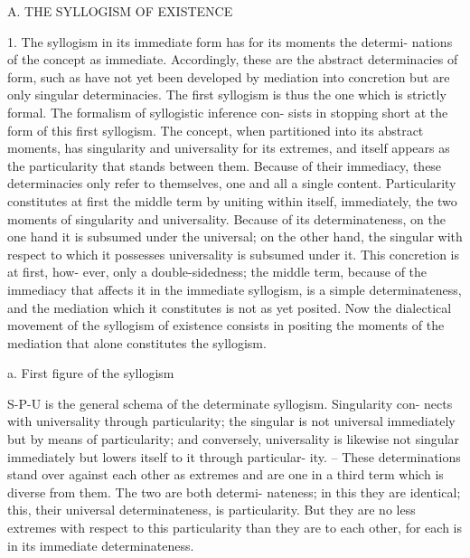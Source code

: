 
A. THE SYLLOGISM OF EXISTENCE

1. The syllogism in its immediate form has for its moments the determi-
nations of the concept as immediate. Accordingly, these are the abstract
determinacies of form, such as have not yet been developed by mediation
into concretion but are only singular determinacies. The first syllogism is thus
the one which is strictly formal. The formalism of syllogistic inference con-
sists in stopping short at the form of this first syllogism. The concept, when
partitioned into its abstract moments, has singularity and universality for its
extremes, and itself appears as the particularity that stands between them.
Because of their immediacy, these determinacies only refer to themselves,
one and all a single content. Particularity constitutes at first the middle term
by uniting within itself, immediately, the two moments of singularity and
universality. Because of its determinateness, on the one hand it is subsumed
under the universal; on the other hand, the singular with respect to which it
possesses universality is subsumed under it. This concretion is at first, how-
ever, only a double-sidedness; the middle term, because of the immediacy
that affects it in the immediate syllogism, is a simple determinateness, and
the mediation which it constitutes is not as yet posited. Now the dialectical
movement of the syllogism of existence consists in positing the moments
of the mediation that alone constitutes the syllogism.

a. First figure of the syllogism

S-P-U is the general schema of the determinate syllogism. Singularity con-
nects with universality through particularity; the singular is not universal
immediately but by means of particularity; and conversely, universality is
likewise not singular immediately but lowers itself to it through particular-
ity. – These determinations stand over against each other as extremes and are
one in a third term which is diverse from them. The two are both determi-
nateness; in this they are identical; this, their universal determinateness, is
particularity. But they are no less extremes with respect to this particularity
than they are to each other, for each is in its immediate determinateness.


